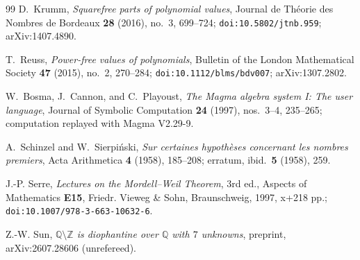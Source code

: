 \documentclass[11pt]{amsart}
\theoremstyle{definition}
\theoremstyle{remark}
\newcommand{\Q}{\mathbb{Q}}
\newcommand{\Z}{\mathbb{Z}}
\begin{document}
\begin{thebibliography}{99}
D.~Krumm,
\emph{Squarefree parts of polynomial values},
Journal de Th\'eorie des Nombres de Bordeaux \textbf{28} (2016), no.~3,
699--724;
\texttt{doi:10.5802/jtnb.959}; arXiv:1407.4890.

T.~Reuss,
\emph{Power-free values of polynomials},
Bulletin of the London Mathematical Society \textbf{47} (2015), no.~2,
270--284;
\texttt{doi:10.1112/blms/bdv007}; arXiv:1307.2802.

W.~Bosma, J.~Cannon, and C.~Playoust,
\emph{The Magma algebra system I: The user language},
Journal of Symbolic Computation \textbf{24} (1997), nos.~3--4,
235--265; computation replayed with Magma V2.29-9.

A.~Schinzel and W.~Sierpi\'nski,
\emph{Sur certaines hypoth\`eses concernant les nombres premiers},
Acta Arithmetica \textbf{4} (1958), 185--208;
erratum, ibid.\ \textbf{5} (1958), 259.

J.-P. Serre,
\emph{Lectures on the Mordell--Weil Theorem}, 3rd ed.,
Aspects of Mathematics \textbf{E15},
Friedr. Vieweg \& Sohn, Braunschweig, 1997, x+218 pp.;
\texttt{doi:10.1007/978-3-663-10632-6}.

Z.-W. Sun,
\emph{$\Q\setminus\Z$ is diophantine over $\Q$ with $7$ unknowns},
preprint, arXiv:2607.28606 (unrefereed).

\end{thebibliography}
\end{document}
